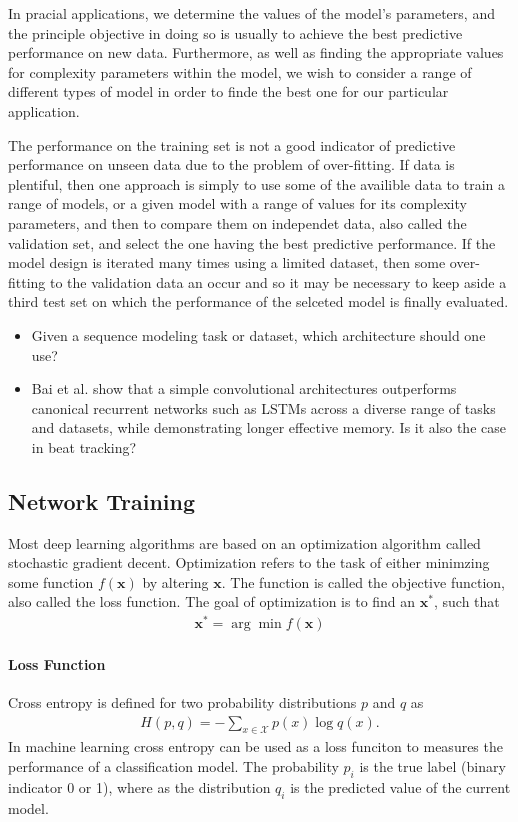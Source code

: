 \documentclass{scrartcl}
\begin{document}
In pracial applications, we determine the values of the model's parameters, and the principle objective in doing so is usually to achieve the best predictive performance on new data. Furthermore, as well as finding the appropriate values for complexity parameters within the model, we wish to consider a range of different types of model in order to finde the best one for our particular application. 

The performance on the training set is not a good indicator of predictive performance on unseen data due to the problem of over-fitting. If data is plentiful, then one approach is simply to use some of the availible data to train a range of models, or a given model with a range of values for its complexity parameters, and then to compare them on independet data, also called the validation set, and select the one having the best predictive performance. If the model design is iterated many times using a limited dataset, then some over-fitting to the validation data an occur and so it may be necessary to keep aside a third test set on which the performance of the selceted model is finally evaluated. 


\begin{itemize}
\item Given a sequence modeling task or dataset, which architecture should one use?
\item Bai et al. \cite{Bai2018} show that a simple convolutional architectures outperforms canonical recurrent networks such as LSTMs across a diverse range of tasks and datasets, while demonstrating longer effective memory. Is it also the case in beat tracking?
\end{itemize}


\subsection{Network Training}

Most deep learning algorithms are based on an optimization algorithm called stochastic gradient decent. Optimization refers to the task of either minimzing some function $f(\mathbf x)$ by altering $\mathbf x$. The function is called the objective function, also called the loss function. The goal of optimization is to find an $\mathbf x^*$, such that
\begin{align}
\mathbf x^* = \arg \min f(\mathbf x)
\end{align} 



\paragraph{Loss Function}
Cross entropy is defined for two probability distributions $p$ and $q$ as
\begin{align}
H(p,q) = - \sum_{x \in \mathcal X} p(x) \log q(x).
\end{align} 
In machine learning cross entropy can be used as a loss funciton to measures the performance of a classification model. The probability $p_{i}$ is the true label (binary indicator 0 or 1), where as the distribution $q_{i}$ is the predicted value of the current model. 
\end{document}
